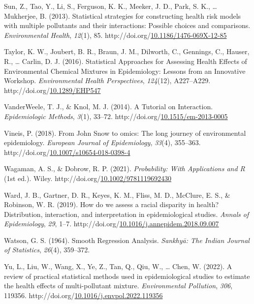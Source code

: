 \documentclass[12pt, twoside]{amherstthesis}
\newenvironment{CSLReferences}[2]%
  {}%
  {\par}
\begin{document}
\begin{CSLReferences}{1}{0}
\leavevmode{}%
Sun, Z., Tao, Y., Li, S., Ferguson, K. K., Meeker, J. D., Park, S. K., \ldots{} Mukherjee, B. (2013). Statistical strategies for constructing health risk models with multiple pollutants and their interactions: Possible choices and comparisons. \emph{Environmental Health}, \emph{12}(1), 85. http://doi.org/\href{https://doi.org/10.1186/1476-069X-12-85}{10.1186/1476-069X-12-85}

\leavevmode{}%
Taylor, K. W., Joubert, B. R., Braun, J. M., Dilworth, C., Gennings, C., Hauser, R., \ldots{} Carlin, D. J. (2016). Statistical {Approaches} for {Assessing} {Health} {Effects} of {Environmental} {Chemical} {Mixtures} in {Epidemiology}: {Lessons} from an {Innovative} {Workshop}. \emph{Environmental Health Perspectives}, \emph{124}(12), A227--A229. http://doi.org/\href{https://doi.org/10.1289/EHP547}{10.1289/EHP547}

\leavevmode{}%
VanderWeele, T. J., \& Knol, M. J. (2014). A {Tutorial} on {Interaction}. \emph{Epidemiologic Methods}, \emph{3}(1), 33--72. http://doi.org/\href{https://doi.org/10.1515/em-2013-0005}{10.1515/em-2013-0005}

\leavevmode{}%
Vineis, P. (2018). From {John} {Snow} to omics: The long journey of environmental epidemiology. \emph{European Journal of Epidemiology}, \emph{33}(4), 355--363. http://doi.org/\href{https://doi.org/10.1007/s10654-018-0398-4}{10.1007/s10654-018-0398-4}

\leavevmode{}%
Wagaman, A. S., \& Dobrow, R. P. (2021). \emph{Probability: {With} {Applications} and {R}} (1st ed.). Wiley. http://doi.org/\href{https://doi.org/10.1002/9781119692430}{10.1002/9781119692430}

\leavevmode{}%
Ward, J. B., Gartner, D. R., Keyes, K. M., Fliss, M. D., McClure, E. S., \& Robinson, W. R. (2019). How do we assess a racial disparity in health? {Distribution}, interaction, and interpretation in epidemiological studies. \emph{Annals of Epidemiology}, \emph{29}, 1--7. http://doi.org/\href{https://doi.org/10.1016/j.annepidem.2018.09.007}{10.1016/j.annepidem.2018.09.007}

\leavevmode{}%
Watson, G. S. (1964). Smooth {Regression} {Analysis}. \emph{Sankhyā: The Indian Journal of Statistics}, \emph{26}(4), 359--372.

\leavevmode{}%
Yu, L., Liu, W., Wang, X., Ye, Z., Tan, Q., Qiu, W., \ldots{} Chen, W. (2022). A review of practical statistical methods used in epidemiological studies to estimate the health effects of multi-pollutant mixture. \emph{Environmental Pollution}, \emph{306}, 119356. http://doi.org/\href{https://doi.org/10.1016/j.envpol.2022.119356}{10.1016/j.envpol.2022.119356}

\end{CSLReferences}
\end{document}
